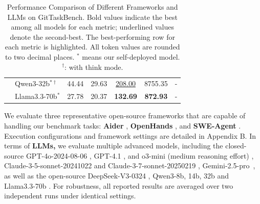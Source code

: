\documentclass[letterpaper]{article} %
\begin{document}
\begin{table}[!t]
\begin{tabular}{llccccc}
& \cellcolor{gray!20}Qwen3-32b$^{*\dagger}$    
& \cellcolor{gray!20}44.44        
& \cellcolor{gray!20}29.63        
& \cellcolor{gray!20}\underline{208.00}     
& \cellcolor{gray!20}8755.35         
& \cellcolor{gray!20}-                
\\
& \cellcolor{gray!12}Llama3.3-70b$^{*}$    
& \cellcolor{gray!12}27.78        
& \cellcolor{gray!12}20.37        
& \cellcolor{gray!12}\textbf{132.69}      
& \cellcolor{gray!12}\textbf{872.93}          
& \cellcolor{gray!12}-            
\\
\bottomrule
\end{tabular}
\caption{
Performance Comparison of Different Frameworks and LLMs on GitTaskBench. 
Bold values indicate the best among all models for each metric; underlined values denote the second-best.
The best-performing row for each metric is highlighted. 
All token values are rounded to two decimal places. 
\texttt{$^*$} means our self-deployed model. 
\texttt{$^\dagger$}: with think mode.
}
\label{tab:git-task-perf}
\end{table}



We evaluate three representative open-source frameworks that are capable of handling our benchmark tasks: \textbf{Aider} \cite{aider2025}, \textbf{OpenHands} \cite{wang2025openhands}, and \textbf{SWE-Agent} \cite{swe-agent}. 
Execution configurations and framework settings are detailed in Appendix B.
In terms of \textbf{LLMs,}
we evaluate multiple advanced models, including the closed-source GPT-4o-2024-08-06 \cite{gpt4o}, GPT-4.1 \cite{gpt41}, and o3-mini (medium reasoning effort) \cite{o3mini}, Claude-3-5-sonnet-20241022 \cite{claude35sonnet} and Claude-3-7-sonnet-20250219 \cite{claude37sonnet}, Gemini-2.5-pro~\cite{gemini25_report}, as well as the open-source DeepSeek-V3-0324 \cite{liu2024deepseekV3}, Qwen3-8b, 14b, 32b \cite{yang2025qwen3} and Llama3.3-70b \cite{llama3.3}. 
For robustness, all reported results are averaged over two independent runs under identical settings.
\end{document}
